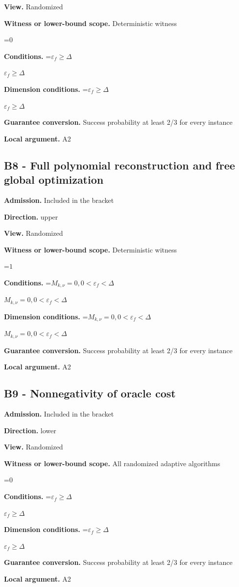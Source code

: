 \documentclass[10pt,a4paper]{article}
\newcommand{\AtlasMath}[1]{\par\begingroup\centering\setbox0=\hbox{$\displaystyle #1$}\ifdim\wd0>1.4\linewidth\typeout{ATLAS WIDE FORMULA: \the\wd0}\fi\ifdim\wd0>\linewidth\resizebox{\linewidth}{!}{\box0}\else\box0\fi\par\endgroup}
\newcommand{\AtlasInlineMath}[1]{\begingroup\setbox0=\hbox{$#1$}\ifdim\wd0>.4\linewidth\endgroup\AtlasMath{#1}\else\endgroup$#1$\fi}
\begin{document}
\textbf{View.} Randomized

\textbf{Witness or lower-bound scope.} Deterministic witness

\AtlasMath{0}
\textbf{Conditions.} \AtlasInlineMath{\varepsilon_f\ge \Delta}

\textbf{Dimension conditions.} \AtlasInlineMath{\varepsilon_f\ge \Delta}

\textbf{Guarantee conversion.} Success probability at least 2/3 for every instance

\textbf{Local argument.} A2

\subsection{B8 - Full polynomial reconstruction and free global optimization}
\textbf{Admission.} Included in the bracket

\textbf{Direction.} upper

\textbf{View.} Randomized

\textbf{Witness or lower-bound scope.} Deterministic witness

\AtlasMath{1}
\textbf{Conditions.} \AtlasInlineMath{M_{k,\nu}=0,0<\varepsilon_f<\Delta}

\textbf{Dimension conditions.} \AtlasInlineMath{M_{k,\nu}=0,0<\varepsilon_f<\Delta}

\textbf{Guarantee conversion.} Success probability at least 2/3 for every instance

\textbf{Local argument.} A2

\subsection{B9 - Nonnegativity of oracle cost}
\textbf{Admission.} Included in the bracket

\textbf{Direction.} lower

\textbf{View.} Randomized

\textbf{Witness or lower-bound scope.} All randomized adaptive algorithms

\AtlasMath{0}
\textbf{Conditions.} \AtlasInlineMath{\varepsilon_f\ge \Delta}

\textbf{Dimension conditions.} \AtlasInlineMath{\varepsilon_f\ge \Delta}

\textbf{Guarantee conversion.} Success probability at least 2/3 for every instance

\textbf{Local argument.} A2
\end{document}

